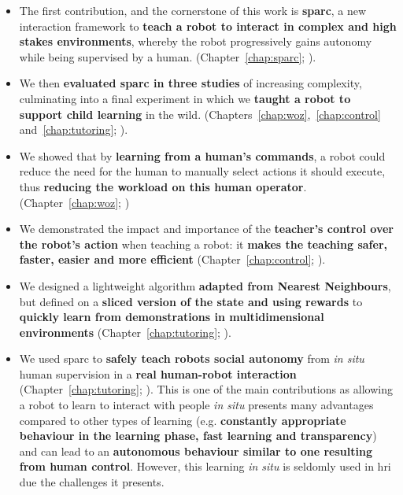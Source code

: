 \begin{itemize}
	\item The first contribution, and the cornerstone of this work is \textbf{\acrfull{sparc}}, a new interaction framework to \textbf{teach a robot to interact in complex and high stakes environments}, whereby the robot progressively gains autonomy while being supervised by a human. (Chapter~\ref{chap:sparc}; \citealt{senft2015human,senft2015sparc}).
	
	\item We then \textbf{evaluated \gls{sparc} in three studies} of increasing complexity, culminating into a final experiment in which we \textbf{taught a robot to support child learning} in the wild. (Chapters~\ref{chap:woz},~\ref{chap:control} and~\ref{chap:tutoring}; \citealt{senft2015sparc,senft2017supervised,senft2018robots}).
	
	\item We showed that by \textbf{learning from a human's commands}, a robot could reduce the need for the human to manually select actions it should execute, thus \textbf{reducing the workload on this human operator}. (Chapter~\ref{chap:woz}; \citealt{senft2015sparc})	
	
	\item We demonstrated the impact and importance of the \textbf{teacher's control over the robot's action} when teaching a robot: it \textbf{makes the teaching safer, faster, easier and more efficient} (Chapter~\ref{chap:control}; \citealt{senft2016sparc,senft2017supervised}).
	
	\item We designed a lightweight algorithm \textbf{adapted from Nearest Neighbours}, but defined on a \textbf{sliced version of the state and using rewards} to \textbf{quickly learn from demonstrations in multidimensional environments} (Chapter~\ref{chap:tutoring}; \citealt{senft2017toward}).
	
	\item We used \gls{sparc} to \textbf{safely teach robots social autonomy}  from \textit{in situ} human supervision in a \textbf{real human-robot interaction} (Chapter~\ref{chap:tutoring}; \citealt{senft2018robots}). This is one of the main contributions as allowing a robot to learn to interact with people \textit{in situ} presents many advantages compared to other types of learning (e.g. \textbf{constantly appropriate behaviour in the learning phase, fast learning and transparency}) and can lead to an \textbf{autonomous behaviour similar to one resulting from human control}. However, this learning \emph{in situ} is seldomly used in \gls{hri} due the challenges it presents.
\end{itemize}

